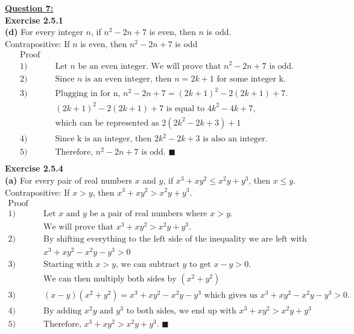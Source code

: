 \documentclass[12pt, letterpaper, twoside]{article}
\begin{document}
\newpage
\noindent \textbf{\underline{Question 7:}}\\
\noindent \textbf{Exercise 2.5.1}\\
\textbf{(d)} For every integer $n$, if $n^2 - 2n + 7$ is even, then $n$ is odd.\\
Contrapositive: If $n$ is even, then $n^2 - 2n + 7$ is odd\\
\begin{align*}
\text{Proof} &\\
1) & \quad \text{Let $n$ be an even integer. We will prove that $n^2 - 2n + 7$ is odd.}\\
2) & \quad \text{Since $n$ is an even integer, then $n = 2k+1$ for some integer k.}\\
3) & \quad \text{Plugging in for n, $n^2 - 2n + 7 = (2k+1)^2 - 2(2k+1) + 7$.}\\
   & \quad \text{$(2k+1)^2 - 2(2k+1) + 7$ is equal to $4k^2 - 4k + 7$,} \\
   & \quad \text{which can be represented as $2(2k^2-2k+3) + 1$}\\
4) & \quad \text{Since k is an integer, then $2k^2-2k+3$ is also an integer.}\\
5) & \quad \text{Therefore, $n^2 - 2n + 7$ is odd. } \blacksquare\\
\end{align*}
\noindent \textbf{Exercise 2.5.4}\\
\textbf{(a)} For every pair of real numbers $x$ and $y$, if $x^3 + xy^2 \leq x^2y + y^3$, then $x \leq y$.\\
\break
Contrapositive: If $x > y$, then $x^3 + xy^2 > x^2y + y^3$.
\begin{align*}
\text{Proof} &\\
1) & \quad \text{Let $x$ and $y$ be a pair of real numbers where $x > y$. }\\
   & \quad \text{We will prove that $x^3 + xy^2 > x^2y + y^3$.}\\
2) & \quad \text{By shifting everything to the left side of the inequality we are left with}\\
   & \quad \text{$x^3 + xy^2 - x^2y - y^3 > 0$}\\ 
3) & \quad \text{Starting with $x > y$, we can subtract $y$ to get $x - y > 0$.}\\    & \quad \text{We can then multiply both sides by $(x^2 + y^2)$}\\  
3) & \quad \text{$(x-y)(x^2 + y^2) = x^3 + xy^2 - x^2y - y^3$ which gives us $x^3 + xy^2 - x^2y - y^3 > 0$.}\\
4) & \quad \text{By adding $x^2y$ and $y^3$ to both sides, we end up with $x^3 + xy^2 > x^2y + y^3$}\\
5) & \quad \text{Therefore, $x^3 + xy^2 > x^2y + y^3$. } \blacksquare\\
\end{align*}\\
\end{document}
